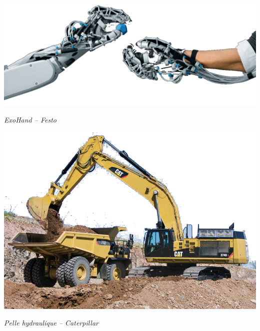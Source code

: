 \documentclass[10pt]{article}
\begin{document}

\begin{minipage}[c]{.23\linewidth}
\begin{center}
\includegraphics[width=.95\textwidth]{images/ExoHand}

\textit{ExoHand -- Festo \cite{festo}}
\end{center}
\end{minipage} \hfill
\begin{minipage}[c]{.23\linewidth}
\begin{center}
\includegraphics[width=.95\textwidth]{images/caterpillar}

\textit{Pelle hydraulique -- Caterpillar \cite{caterpillar}}
\end{center}
\end{minipage} \hfill
\end{document}

